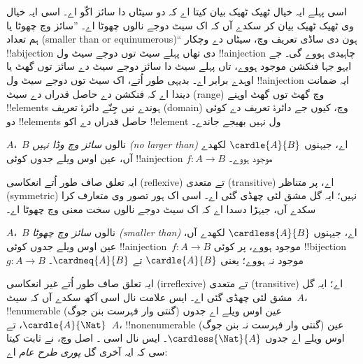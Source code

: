 \documentclass[../../../include/open-logic-section]{subfiles}
\begin{document}


\begin{explain}
اسی پہلے ایہ خیال ٹھیک ٹھیک بیان کیتا اے کہ دو سیٹاں دا سائز اکّو
اے۔ اسی ایہ خیال وی ٹھیک ٹھیک بیان کر سکدے آں کہ اک سیٹ دوجے نالوں
چھوٹا اے۔ ”سائز وچ چھوٹا یا ہم تعداد (smaller than or equinumerous)“
ہون دی ساڈی تعریف وچ، سیٹاں دے وچکار !!a{bijection} دی تھاں پہلے
سیٹ توں دوجے سیٹ ول !!a{injection} چاہیدی ہووے گی۔ جے ایہو جہا
فنکشن موجود ہووے، تاں پہلے سیٹ دا سائز دوجے سیٹ دے سائز توں گھٹ یا
اوہدے برابر اے۔ بدیہی طور اُتے، اک سیٹ توں دوجے سیٹ ول
!!a{injection} ایہ ضمانت دیندا اے کہ فنکشن دے حاصل قدراں دے سیٹ
(range) وچ گھٹ توں گھٹ اوہنے !!{element}s ہوندے نیں جِنّے دائرۂ
تعریف (domain) وچ، کیوں جے دائرۂ تعریف دے کوئی دو !!{element}s
حاصل قدراں دے اکو !!{element} ول نہیں بھیجے جاندے۔
\end{explain}

\begin{defn}
$A$،~$B$ نالوں \emph{سائز وچ وڈا نہیں (no larger than)} اے، جیہنوں
$\cardle{A}{B}$ لکھدے آں، عین اوس ویلے جدوں کوئی !!a{injection}
$f \colon A \to B$ موجود ہووے۔
\end{defn}

ایہ تعلق صاف طور اُتے انعکاسی (reflexive) تے متعدی (transitive) اے،
پر متناظر (symmetric) نہیں؛ ایہ گل مشق لئی چھڈی گئی اے۔ اسی اک ہور
تصور وی متعارف کرا سکدے آں، جیہڑا دسدا اے کہ اک سیٹ دوجے نالوں سخت
معنی وچ چھوٹا اے۔

\begin{defn}
$A$،~$B$ نالوں \emph{سائز وچ چھوٹا (smaller than)} اے، جیہنوں
$\cardless{A}{B}$ لکھدے آں، عین اوس ویلے جدوں کوئی
!!a{injection}~$f\colon A \to B$ موجود ہووے، پر کوئی
!!{bijection}~$g\colon A \to B$ موجود نہ ہووے؛ یعنی
$\cardle{A}{B}$ تے $\cardneq{A}{B}$۔
\end{defn}

ایہ تعلق صاف طور اُتے غیر انعکاسی (irreflexive) تے متعدی
(transitive) اے؛ ایہ گل مشق لئی چھڈی گئی اے۔ ایس علامت نال اسی آکھ
سکدے آں کہ سیٹ~$A$، !!{enumerable} (گنتی وار فہرست بنن جوگ) عین اوس
ویلے اے جدوں $\cardle{A}{\Nat}$، تے~$A$، !!{nonenumerable} (گنتی
وار فہرست نہ بنن جوگ) عین اوس ویلے اے جدوں
$\cardless{\Nat}{A}$۔ ایس نال اسی
۔ اصل وچ، \citet{Cantor1892} نے
ثابت کیتا سی کہ ایہ آخری گل \emph{پوری طرح عام} اے:
\end{document}
